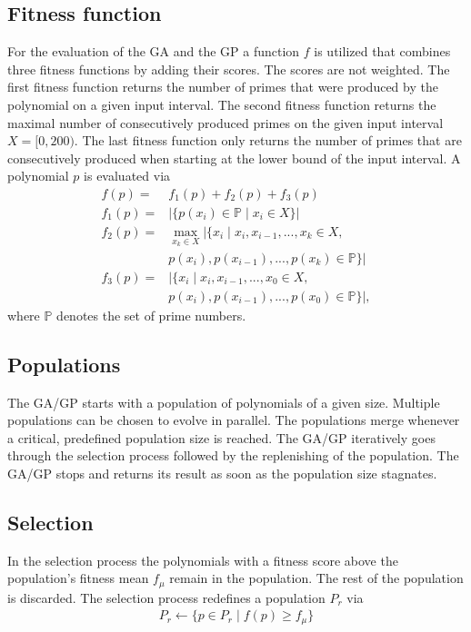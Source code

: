 \documentclass[11pt,a4paper]{article}
\begin{document}
\subsection*{Fitness function}
For the evaluation of the GA and the GP a function $f$ is utilized that combines three fitness functions by adding their scores. The scores are not weighted. The first fitness function returns the number of primes that were produced by the polynomial on a given input interval. The second fitness function returns the maximal number of consecutively produced primes on the given input interval $X = [0, 200)$. The last fitness function only returns the number of primes that are consecutively produced when starting at the lower bound of the input interval. A polynomial $p$ is evaluated via
\begin{align*}
f(p) = &f_1(p)+f_2(p)+f_3(p) \\
f_1(p) = &|\{p(x_i) \in \mathbb{P} \; | \; x_i \in X \}| \\
f_2(p) = &\max_{x_k \in X}|\{x_{i} \; | \; x_{i}, x_{i-1}, ..., x_k \in X, \\ & p(x_{i}), p(x_{i-1}), ..., p(x_k) \in \mathbb{P} \}| \\
f_3(p) = &|\{x_{i} \; | \; x_{i}, x_{i-1}, ..., x_0 \in X, \\ & p(x_{i}), p(x_{i-1}), ..., p(x_0) \in \mathbb{P} \}|,
\end{align*}
where $\mathbb{P}$ denotes the set of prime numbers.
\subsection*{Populations}
The GA/GP starts with a population of polynomials of a given size. Multiple populations can be chosen to evolve in parallel. The populations merge whenever a critical, predefined population size is reached. The GA/GP iteratively goes through the selection process followed by the replenishing of the population. The GA/GP stops and returns its result as soon as the population size stagnates.
\subsection*{Selection}
In the selection process the polynomials with a fitness score above the population's fitness mean $f_{\mu}$ remain in the population. The rest of the population is discarded. The selection process redefines a population $P_r$ via
\begin{align*}
P_r \leftarrow \{p \in P_r \; | \; f(p) \geq f_{\mu}\}
\end{align*}
\end{document}
